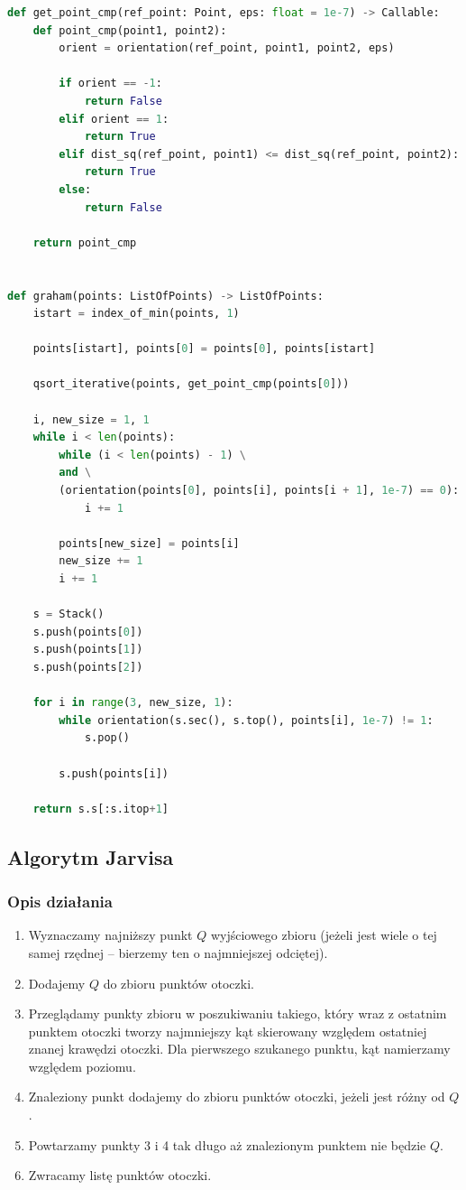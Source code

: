 \documentclass[11pt]{article}
\theoremstyle{remark} \newtheorem{definition}{def.}
\theoremstyle{definition} \newtheorem{twierdzenie}{tw.}
\begin{document}
    \begin{lstlisting}[language=Python]
def get_point_cmp(ref_point: Point, eps: float = 1e-7) -> Callable:
    def point_cmp(point1, point2):
        orient = orientation(ref_point, point1, point2, eps)
        
        if orient == -1:
            return False
        elif orient == 1:
            return True
        elif dist_sq(ref_point, point1) <= dist_sq(ref_point, point2):
            return True
        else:
            return False

    return point_cmp


def graham(points: ListOfPoints) -> ListOfPoints:
    istart = index_of_min(points, 1)

    points[istart], points[0] = points[0], points[istart]    

    qsort_iterative(points, get_point_cmp(points[0]))

    i, new_size = 1, 1
    while i < len(points):
        while (i < len(points) - 1) \
        and \
        (orientation(points[0], points[i], points[i + 1], 1e-7) == 0):  
            i += 1
        
        points[new_size] = points[i]
        new_size += 1
        i += 1
    
    s = Stack()
    s.push(points[0])
    s.push(points[1])
    s.push(points[2])
    
    for i in range(3, new_size, 1):
        while orientation(s.sec(), s.top(), points[i], 1e-7) != 1:
            s.pop()

        s.push(points[i])

    return s.s[:s.itop+1]
    \end{lstlisting}



\subsection{Algorytm Jarvisa}
    \subsubsection{Opis działania}
    \begin{enumerate}
        \item   Wyznaczamy najniższy punkt $Q$ wyjściowego zbioru (jeżeli jest wiele o tej samej rzędnej -- bierzemy ten o najmniejszej odciętej).
        \item   Dodajemy $Q$ do zbioru punktów otoczki. 
        \item   Przeglądamy punkty zbioru w poszukiwaniu takiego, który wraz z ostatnim punktem otoczki tworzy najmniejszy kąt skierowany względem ostatniej znanej
                krawędzi otoczki. Dla pierwszego szukanego punktu, kąt namierzamy względem poziomu.
        \item   Znaleziony punkt dodajemy do zbioru punktów otoczki, jeżeli jest różny od $Q$.
        \item   Powtarzamy punkty 3 i 4 tak długo aż znalezionym punktem nie będzie $Q$.
        \item   Zwracamy listę punktów otoczki. 
    \end{enumerate}
\end{document}
